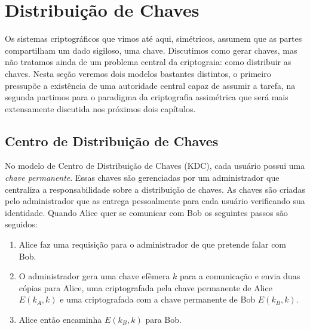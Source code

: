 \chapter{Distribuição de Chaves}
\label{cha:distribuicao-chaves}

Os sistemas criptográficos que vimos até aqui, simétricos, assumem que as partes compartilham um dado sigiloso, uma chave.
Discutimos como gerar chaves, mas não tratamos ainda de um problema central da criptograia: como distribuir as chaves.
Nesta seção veremos dois modelos bastantes distintos, o primeiro pressupõe a existência de uma autoridade central capaz de assumir a tarefa, na segunda partimos para o paradigma da criptografia assimétrica que será mais extensamente discutida nos próximos dois capítulos.

\section{Centro de Distribuição de Chaves}
\label{sec:kdc}

No modelo de Centro de Distribuição de Chaves (KDC), cada usuário possui uma {\em chave permanente}.
Essas chaves são gerenciadas por um administrador que centraliza a responsabilidade sobre a distribuição de chaves.
As chaves são criadas pelo administrador que as entrega pessoalmente para cada usuário verificando sua identidade.
Quando Alice quer se comunicar com Bob os seguintes passos são seguidos:

\begin{enumerate}
\item Alice faz uma requisição para o administrador de que pretende falar com Bob.
\item O administrador gera uma chave efêmera $k$ para a comunicação e envia duas cópias para Alice, uma criptografada pela chave permanente de Alice $E(k_A, k)$ e uma criptografada com a chave permanente de Bob $E(k_B, k)$.
\item Alice então encaminha $E(k_B, k)$ para Bob.
\end{enumerate}

\begin{center}
\end{center}

